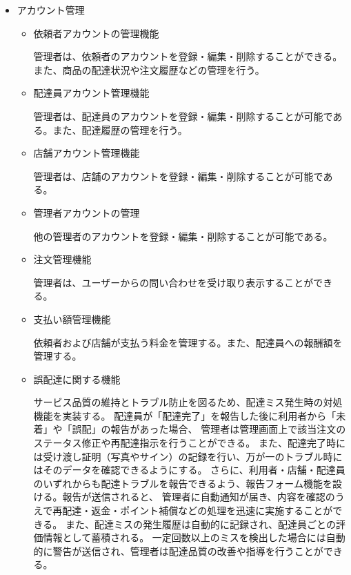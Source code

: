 \begin{itemize}
  \item アカウント管理
    \begin{itemize}
        \item 依頼者アカウントの管理機能
        
        管理者は、依頼者のアカウントを登録・編集・削除することができる。また、商品の配達状況や注文履歴などの管理を行う。


        \item 配達員アカウント管理機能
        
        管理者は、配達員のアカウントを登録・編集・削除することが可能である。また、配達履歴の管理を行う。

        \item 店舗アカウント管理機能

        管理者は、店舗のアカウントを登録・編集・削除することが可能である。
        
        \item 管理者アカウントの管理

        他の管理者のアカウントを登録・編集・削除することが可能である。
        
        \item 注文管理機能
        
        管理者は、ユーザーからの問い合わせを受け取り表示することができる。

        \item 支払い額管理機能

        依頼者および店舗が支払う料金を管理する。また、配達員への報酬額を管理する。

        \item 誤配達に関する機能

        サービス品質の維持とトラブル防止を図るため、配達ミス発生時の対処機能を実装する。
        配達員が「配達完了」を報告した後に利用者から「未着」や「誤配」の報告があった場合、
        管理者は管理画面上で該当注文のステータス修正や再配達指示を行うことができる。
        また、配達完了時には受け渡し証明（写真やサイン）の記録を行い、万が一のトラブル時にはそのデータを確認できるようにする。
        さらに、利用者・店舗・配達員のいずれからも配達トラブルを報告できるよう、報告フォーム機能を設ける。報告が送信されると、
        管理者に自動通知が届き、内容を確認のうえで再配達・返金・ポイント補償などの処理を迅速に実施することができる。
        また、配達ミスの発生履歴は自動的に記録され、配達員ごとの評価情報として蓄積される。
        一定回数以上のミスを検出した場合には自動的に警告が送信され、管理者は配達品質の改善や指導を行うことができる。


    \end{itemize}
  
\end{itemize}

